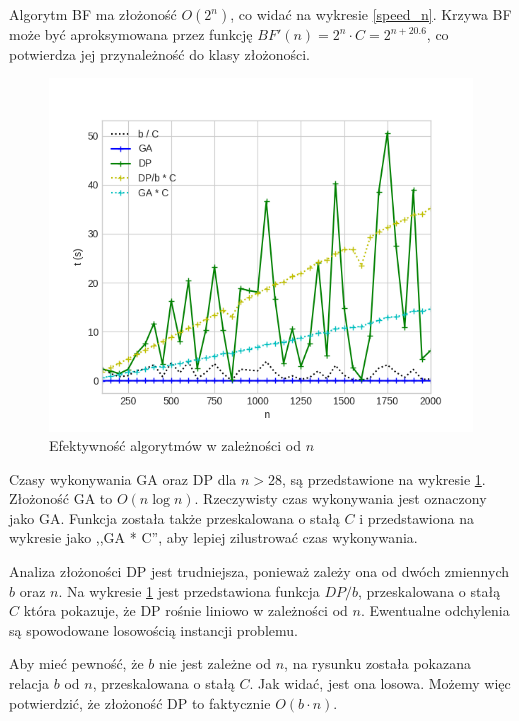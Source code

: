\documentclass[11pt,twocolumn]{article}
\begin{document}
Algorytm BF ma złożoność $O(2^n)$, co widać na wykresie \ref{speed_n}.
Krzywa BF może być aproksymowana przez funkcję
$BF'(n) = 2^n \cdot C = 2^{n + 20.6}$,
co potwierdza jej przynależność do klasy złożoności.

\begin{figure}[h!]
	\includegraphics[width=\linewidth]{speed-n-big.png}
	\caption{Efektywność algorytmów w zależności od $n$ \label{speed_n_big}}
\end{figure}

Czasy wykonywania GA oraz DP dla $n > 28$, są przedstawione na wykresie \ref{speed_n_big}.
Złożoność GA to $O(n \log n)$. Rzeczywisty czas wykonywania jest oznaczony jako GA.
Funkcja została także przeskalowana o stałą $C$ i przedstawiona na wykresie jako ,,GA * C'',
aby lepiej zilustrować czas wykonywania.

Analiza złożoności DP jest trudniejsza, 
ponieważ zależy ona od dwóch zmiennych $b$ oraz $n$.
Na wykresie \ref{speed_n_big} jest przedstawiona funkcja $DP/b$,
przeskalowana o stałą $C$ która pokazuje, że 
DP rośnie liniowo w zależności od $n$.
Ewentualne odchylenia są spowodowane losowością instancji problemu.

Aby mieć pewność, że $b$ nie jest zależne od $n$, na rysunku została
pokazana relacja $b$ od $n$, przeskalowana o stałą $C$.
Jak widać, jest ona losowa.
Możemy więc potwierdzić, że złożoność DP to faktycznie $O(b \cdot n)$.
\end{document}
